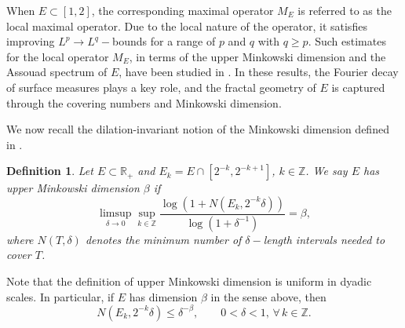 \documentclass[a4paper,reqno]{amsart}
\newtheorem{definition}{Definition}[section]
\numberwithin{equation}{section}
\newcommand{\R}{{\mathbb {R}}}
\newcommand{\Z}{{\mathbb Z}}
\begin{document}
	When $E\subset[1,2]$, the corresponding maximal operator $M_E$ is referred to as the local maximal operator. Due to the local nature of the operator, it satisfies improving $L^p\to L^q-$bounds for a range of $p$ and $q$ with $q\geq p$. Such estimates for the local operator $M_E$, in terms of the upper Minkowski dimension and the Assouad spectrum of $E$, have been studied in \cites{AHRS, RoosSeeger, LRZZ}. In these results, the Fourier decay of surface measures plays a key role, and the fractal geometry of $E$ is captured through the covering numbers and Minkowski dimension. 
	
	We now recall the dilation-invariant notion of the Minkowski dimension defined in \cite[(1.3)]{SWW1}.
	\begin{definition}\label{def}
		Let $E\subset\R_+$ and $E_k=E\cap[2^{-k},2^{-k+1}]$, $k\in\Z$. We say $E$ has upper Minkowski dimension $\beta$ if
		\[\limsup_{\delta\to0}\sup_{k\in\Z}\frac{\log(1+ N(E_k,2^{-k}\delta))}{\log(1+\delta^{-1})}=\beta,\]
		where $N(T,\delta)$ denotes the minimum number of $\delta-$length intervals needed to cover $T$.
	\end{definition}
	Note that the definition of upper Minkowski dimension is uniform in dyadic scales. In particular, if $E$ has dimension $\beta$ in the sense above, then
	\[N(E_k,2^{-k}\delta)\leq \delta^{-\beta},\qquad 0<\delta<1,\,\forall\, k\in\Z.\]
\end{document}

